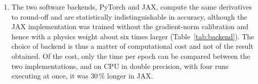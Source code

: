 \begin{enumerate}
\item The two software backends, PyTorch and JAX, compute the same derivatives to round-off and are statistically indistinguishable in accuracy, although the JAX implementation was trained without the gradient-norm calibration and hence with a physics weight about six times larger (Table~\ref{tab:backend}). The choice of backend is thus a matter of computational cost and not of the result obtained. Of the cost, only the time per epoch can be compared between the two implementations, and on CPU in double precision, with four runs executing at once, it was 30\,\% longer in JAX. %


\end{enumerate}
